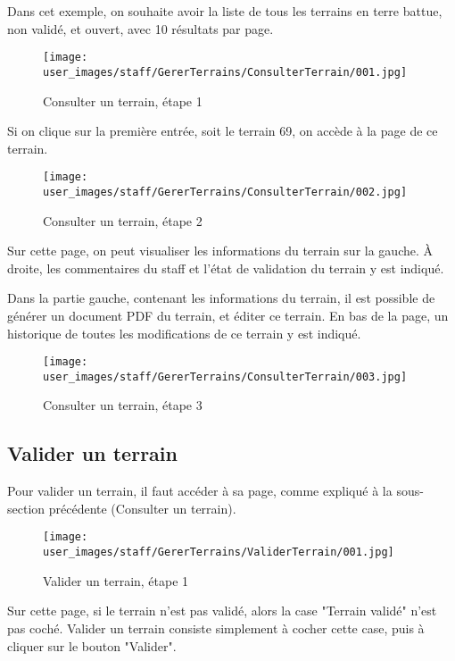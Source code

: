 Dans cet exemple, on souhaite avoir la liste de tous les terrains en terre battue, non validé, et ouvert, avec 10 résultats par page.

\begin{figure}[H]
\centering
\texttt{[image: user\_images/staff/GererTerrains/ConsulterTerrain/001.jpg]}
\caption{Consulter un terrain, étape 1}
\end{figure}

Si on clique sur la première entrée, soit le terrain 69, on accède à la page de ce terrain.

\begin{figure}[H]
\centering
\texttt{[image: user\_images/staff/GererTerrains/ConsulterTerrain/002.jpg]}
\caption{Consulter un terrain, étape 2}
\end{figure}

Sur cette page, on peut visualiser les informations du terrain sur la gauche. À droite, les commentaires du staff et l'état de validation du terrain y est indiqué. \newline

Dans la partie gauche, contenant les informations du terrain, il est possible de générer un document PDF du terrain, et éditer ce terrain. En bas de la page, un historique de toutes les modifications de ce terrain y est indiqué.

\begin{figure}[H]
\centering
\texttt{[image: user\_images/staff/GererTerrains/ConsulterTerrain/003.jpg]}
\caption{Consulter un terrain, étape 3}
\end{figure}

\subsection{Valider un terrain}

Pour valider un terrain, il faut accéder à sa page, comme expliqué à la sous-section précédente (Consulter un terrain).

\begin{figure}[H]
\centering
\texttt{[image: user\_images/staff/GererTerrains/ValiderTerrain/001.jpg]}
\caption{Valider un terrain, étape 1}
\end{figure}

Sur cette page, si le terrain n'est pas validé, alors la case "Terrain validé" n'est pas coché. Valider un terrain consiste simplement à cocher cette case, puis à cliquer sur le bouton "Valider".

